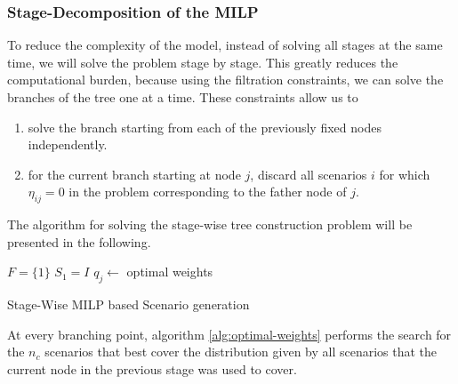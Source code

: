 \subsubsection{Stage-Decomposition of the MILP}
To reduce the complexity of the model, instead of solving all stages at the same time, we will solve the problem stage by stage. This greatly reduces the computational burden, because using the filtration constraints, we can solve the branches of the tree one at a time. These constraints allow us to 
\begin{enumerate}
\item solve the branch starting from each of the previously fixed nodes independently.
\item for the current branch starting at node $j$, discard all scenarios $i$ for which $\eta_{ij}=0$ in the problem corresponding to the father node of $j$.
\end{enumerate}

The algorithm for solving the stage-wise tree construction problem will be presented in the following.
\begin{algorithm}
  $F = \{1\}$
  $S_1 = I$
  $q_j\leftarrow $ optimal weights 
\caption{Stage-Wise MILP based Scenario generation}
\label{alg:stage-wise-milp}
\end{algorithm}
At every branching point, algorithm \ref{alg:optimal-weights} performs the search for the $n_c$ scenarios that best cover the distribution given by all scenarios that the current node in the previous stage was used to cover.

